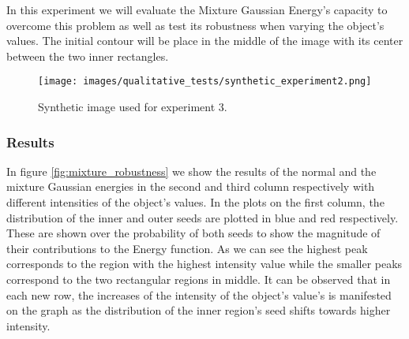 In this experiment we will evaluate the Mixture Gaussian Energy's capacity to overcome this problem as well as test its robustness when varying the object's values. The initial contour will be place in the middle of the image with its center between the two inner rectangles.

\begin{figure}[h!]
	\centering
	{\texttt{[image: images/qualitative\_tests/synthetic\_experiment2.png]}}
	\caption{Synthetic image used for experiment 3.}
	\label{fig:synthetic_experiment2}
\end{figure}

\subsubsection{Results}
In figure \ref{fig:mixture_robustness} we show the results of the normal and the mixture Gaussian energies in the second and third column respectively with different intensities of the object's values. In the plots on the first column, the distribution of the inner and outer seeds are plotted in blue and red respectively. These are shown over the probability of both seeds to show the magnitude of their contributions to the Energy function. As we can see the highest peak corresponds to the region with the highest intensity value while the smaller peaks correspond to the two rectangular regions in middle. It can be observed that in each new row, the increases of the intensity of the object's value's  is manifested on the graph as the distribution of the inner region's seed shifts towards higher intensity.

